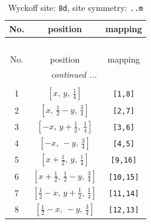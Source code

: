 \documentclass[fleqn,8pt]{jsarticle}
\begin{document}
\begin{longtable}{ccc}
\caption{Wyckoff site: {\tt 8d}, site symmetry: {\tt ..m}}
 \\
 \hline \hline
No. & position & mapping \\ \hline \endfirsthead

\multicolumn{2}{l}{\tablename\ \thetable{}} \\
 \hline \hline
No. & position & mapping \\ \hline \endhead

 \hline \hline
\multicolumn{2}{r}{\footnotesize\it continued ...} \\ \endfoot

 \hline \hline
\multicolumn{2}{r}{} \\ \endlastfoot

1 & $\left[ x,\, y,\, \frac{1}{4} \right]$ & {\tt [1,8]} \\ \hline
2 & $\left[ x,\, \frac{1}{2} - y,\, \frac{3}{4} \right]$ & {\tt [2,7]} \\ \hline
3 & $\left[ - x,\, y + \frac{1}{2},\, \frac{1}{4} \right]$ & {\tt [3,6]} \\ \hline
4 & $\left[ - x,\, - y,\, \frac{3}{4} \right]$ & {\tt [4,5]} \\ \hline
5 & $\left[ x + \frac{1}{2},\, y,\, \frac{1}{4} \right]$ & {\tt [9,16]} \\ \hline
6 & $\left[ x + \frac{1}{2},\, \frac{1}{2} - y,\, \frac{3}{4} \right]$ & {\tt [10,15]} \\ \hline
7 & $\left[ \frac{1}{2} - x,\, y + \frac{1}{2},\, \frac{1}{4} \right]$ & {\tt [11,14]} \\ \hline
8 & $\left[ \frac{1}{2} - x,\, - y,\, \frac{3}{4} \right]$ & {\tt [12,13]} \\
\end{longtable}
\renewcommand{\arraystretch}{1.2}
\end{document}
